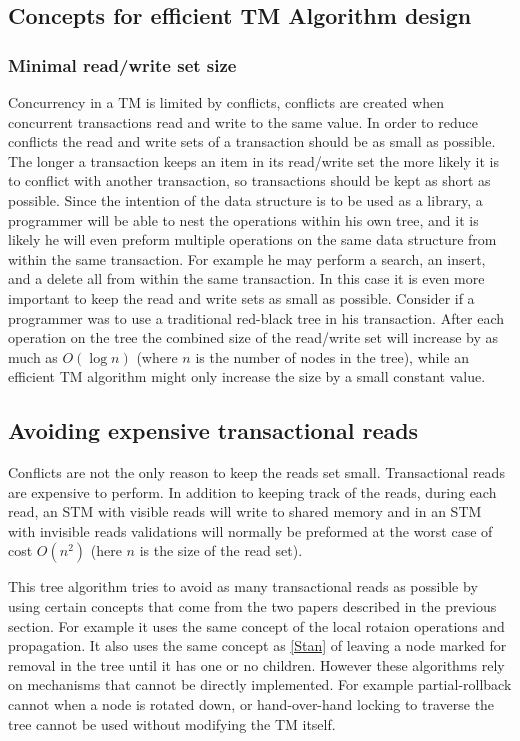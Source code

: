 \documentclass[10pt]{sigplanconf}
\begin{document}
\subsection{Concepts for efficient TM Algorithm design}
\subsubsection{Minimal read/write set size}
Concurrency in a TM is limited by conflicts, conflicts are created when concurrent transactions read and write to the same value.
In order to reduce conflicts the read and write sets of a transaction should be as small as possible.
The longer a transaction keeps an item in its read/write set the more likely it is to conflict with another transaction, so transactions should be kept as short as possible.
Since the intention of the data structure is to be used as a library, a programmer will be able to nest the operations within his own tree, and it is likely he will even preform multiple operations on the same data structure from within the same transaction.
For example he may perform a search, an insert, and a delete all from within the same transaction.
In this case it is even more important to keep the read and write sets as small as possible.
Consider if a programmer was to use a traditional red-black tree in his transaction.
After each operation on the tree the combined size of the read/write set will increase by as much as $O(\log{n})$ (where $n$ is the number of nodes in the tree),
while an efficient TM algorithm might only increase the size by a small constant value.

\subsection{Avoiding expensive transactional reads}
Conflicts are not the only reason to keep the reads set small.
Transactional reads are expensive to perform.
In addition to keeping track of the reads, during each read, an STM with visible reads will write to shared memory
 and in an STM with invisible reads validations will normally be preformed at the worst case of cost $O(n^2)$ 
(here $n$ is the size of the read set).

This tree algorithm tries to avoid as many transactional reads as possible by using certain concepts
that come from the two papers described in the previous section.
For example it uses the same concept of the local rotaion operations and propagation.
It also uses the same concept as \ref{Stan} of leaving a node marked for removal in the tree until it has one or no children.
However these algorithms rely on mechanisms that cannot be directly implemented.
For example partial-rollback cannot when a node is rotated down, or hand-over-hand locking to traverse the tree cannot be used without modifying the TM itself.
\end{document}
